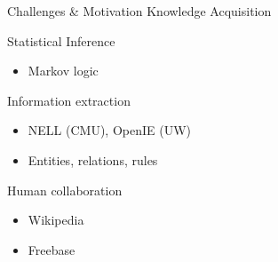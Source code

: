 \documentclass[onlymath,xcolor=pdftex,dvipsnames,table]{beamer}
\begin{document}
{
\begin{frame}{Challenges \& Motivation}
{\large Knowledge Acquisition}
\vspace{-30pt}
\begin{itemize}
  {\bfseries\color{red}
  \item Statistical Inference
    \begin{itemize}\color{red}
      \item Markov logic
    \end{itemize}}
  \item Information extraction
    \begin{itemize}
      \item NELL (CMU), OpenIE (UW)
      \item Entities, relations, rules
    \end{itemize}
  \item Human collaboration
    \begin{itemize}
      \item Wikipedia
      \item Freebase
    \end{itemize}
\end{itemize}
\end{frame}}
\end{document}
